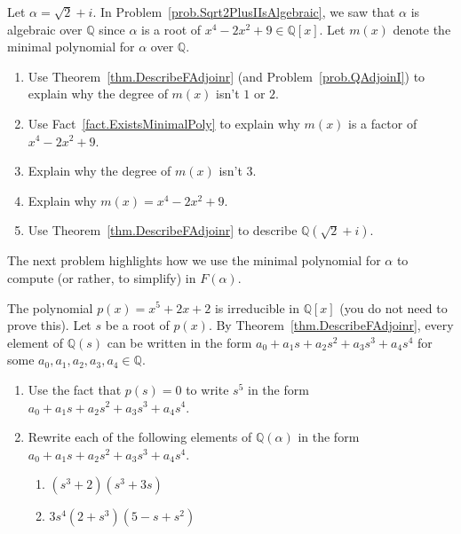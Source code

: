 \begin{problem}\label{prob.DescribeQAdjoinSqrt2PlusI}
Let $\alpha = \sqrt{2} + i$. In Problem~\ref{prob.Sqrt2PlusIIsAlgebraic}, we saw that $\alpha$ is algebraic over $\mathbb{Q}$ since $\alpha$ is a root of  $x^4-2x^2+9\in \mathbb{Q}[x]$. Let $m(x)$ denote the minimal polynomial for $\alpha$ over $\mathbb{Q}$.
\begin{enumerate}
\item Use Theorem~\ref{thm.DescribeFAdjoinr} (and Problem~\ref{prob.QAdjoinI}) to explain why the degree of $m(x)$ isn't $1$ or $2$.
\item Use Fact~\ref{fact.ExistsMinimalPoly} to explain why $m(x)$ is a factor of $x^4-2x^2+9$.
\item Explain why the degree of $m(x)$ isn't $3$.
\item Explain why  $m(x)=x^4-2x^2+9$.
\item Use Theorem~\ref{thm.DescribeFAdjoinr} to describe $\mathbb{Q}(\sqrt{2} + i)$.
\end{enumerate}
\end{problem}

The next problem highlights how we use the minimal polynomial for $\alpha$ to compute (or rather, to simplify) in  $F(\alpha)$.

\begin{problem}\label{prob.DescribeQRootx52x2}
The polynomial $p(x) = x^5 + 2x + 2$ is irreducible in $\mathbb{Q}[x]$ (you do not need to prove this). Let $s$ be a root of $p(x)$. By Theorem~\ref{thm.DescribeFAdjoinr}, every element of $\mathbb{Q}(s)$ can be written in the form $a_0 + a_1s + a_2s^2 + a_3s^3 + a_4s^4$ for some $a_0,a_1,a_2,a_3,a_4 \in \mathbb{Q}$.
\begin{enumerate}
\item Use the fact that $p(s) = 0$ to write $s^5$ in the form  $a_0 + a_1s + a_2s^2 + a_3s^3 + a_4s^4$.
\item Rewrite each of the following elements of $\mathbb{Q}(\alpha)$ in the form  $a_0 + a_1s + a_2s^2 + a_3s^3 + a_4s^4$.
\begin{enumerate}
\item $(s^3+2)(s^3+3s)$
\item $3s^4(2+s^3)(5-s+s^2)$
\end{enumerate}
\end{enumerate}
\end{problem}

